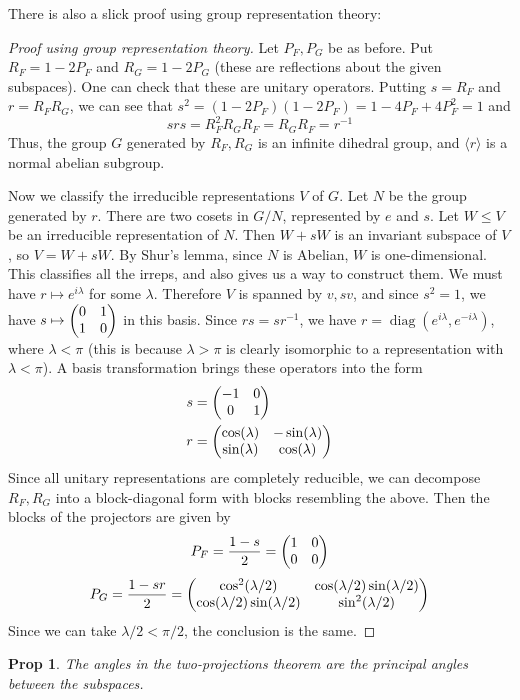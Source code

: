 \documentclass[11pt]{article}
\newtheorem{prop}{Prop}
\newcommand{\diag}{\operatorname{diag}}
\begin{document}
There is also a slick proof using group representation theory:
\begin{proof}[Proof using group representation theory]
    Let $P_F, P_G$ be as before. Put $R_F = 1 - 2P_F$ and $R_G = 1-2P_G$ (these are reflections about the given subspaces). One can check that these are unitary operators. Putting $s = R_F$ and $r = R_FR_G$, we can see that $s^2 = (1-2P_F)(1-2P_F) = 1-4P_F + 4P_F^2 = 1$ and 
    $$
    srs = R_F^2R_G R_F  = R_GR_F = r^{-1}
    $$
    Thus, the group $G$ generated by $R_F, R_G$ is an infinite dihedral group, and $\langle r \rangle$ is a normal abelian subgroup. 

    Now we classify the irreducible representations $V$ of $G$. Let $N$ be the group generated by $r$. There are two cosets in $G/N$, represented by $e$ and $s$. Let $W \leq V$ be an irreducible representation of $N$. Then $W + sW$ is an invariant subspace of $V$, so $V = W + sW$. By Shur's lemma, since $N$ is Abelian, $W$ is one-dimensional. This classifies all the irreps, and also gives us a way to construct them. We must have $r \mapsto e^{i\lambda}$ for some $\lambda$. Therefore $V$ is spanned by $v, sv$, and since $s^2 = 1$, we have $s \mapsto \mqty(0 & 1\\ 1 & 0)$ in this basis. Since $rs = sr^{-1}$, we have $r = \diag(e^{i\lambda}, e^{-i\lambda})$, where $\lambda < \pi$ (this is because $\lambda > \pi$ is clearly isomorphic to a representation with $\lambda < \pi$). A basis transformation brings these operators into the form
    \begin{align}
        s &= \mqty(-1 & 0 \\ 0 & 1) \\
        r &= \mqty(\cos(\lambda) & -\sin(\lambda) \\ \sin(\lambda) & \cos(\lambda))
    \end{align}
Since all unitary representations are completely reducible, we can decompose $R_F, R_G$ into a block-diagonal form with blocks resembling the above. Then the blocks of the projectors are given by
$$
    P_F = \frac{1-s}{2} = \mqty(1 & 0 \\ 0 & 0)
$$
$$
    P_G = \frac{1-sr}{2} = \mqty(\cos[2](\lambda/2) & \cos(\lambda/2)\sin(\lambda/2) \\ \cos(\lambda/2)\sin(\lambda/2) & \sin[2](\lambda/2))
$$
Since we can take $\lambda/2 < \pi/2$, the conclusion is the same.
\end{proof}

\begin{prop}
The angles in the two-projections theorem are the principal angles between the subspaces.
\end{prop}
\end{document}
